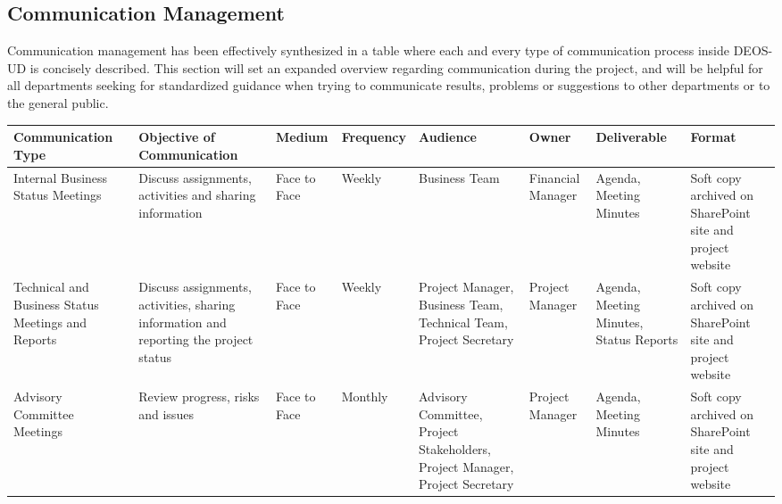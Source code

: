 \subsection{Communication Management}

Communication management has been effectively synthesized in a table where each and every type of communication process inside DEOS-UD is concisely described. This section will set an expanded overview regarding communication during the project, and will be helpful for all departments seeking for standardized guidance when trying to communicate results, problems or suggestions to other departments or to the general public. 

\begin{landscape}
	
	
	\begin{longtable}{| >{\raggedright\arraybackslash}p{2.8cm}  | >{\raggedright\arraybackslash}p{2.9cm} | >{\raggedright\arraybackslash}p{1.8cm} | >{\raggedright\arraybackslash}p{2cm} | >{\raggedright\arraybackslash}p{2.4cm} | >{\raggedright\arraybackslash}p{2.4cm} | >{\raggedright\arraybackslash}p{2.6cm} | >{\raggedright\arraybackslash}p{2.5cm} |  }
		
		
		\toprule [2pt]
		
		\textbf{Communication Type} & \textbf{Objective of Communication} & \textbf{Medium}  &\textbf{Frequency} &\textbf{Audience}& \textbf{Owner}& \textbf{Deliverable} &\textbf{Format} \\  
		
		\midrule [1.5pt]
		\endhead
		
		Internal Business Status Meetings& Discuss assignments, activities and sharing information  & Face to Face   &  Weekly &Business Team     & Financial Manager  & Agenda, Meeting Minutes  &Soft copy archived on SharePoint site and project website\\  
		
		\hline
		
		Technical and Business Status Meetings and Reports&Discuss assignments, activities, sharing information and reporting the project status   &Face to Face    & Weekly  & Project Manager, Business Team, Technical Team, Project Secretary    &Project Manager   & Agenda, Meeting Minutes, Status Reports  &Soft copy archived on SharePoint site and project website\\  
		
		\hline
		
		Advisory Committee Meetings& Review progress, risks and issues  & Face to Face   &Monthly   &  Advisory Committee, Project Stakeholders, Project Manager, Project Secretary   &Project Manager   & Agenda, Meeting Minutes  &Soft copy archived on SharePoint site and project website\\  
		

\end{longtable}
\end{landscape}
